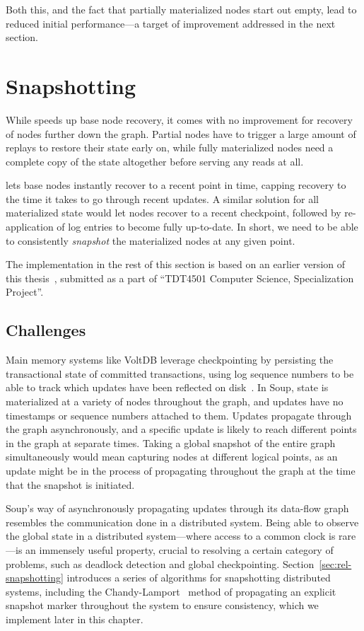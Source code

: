 Both this, and the fact that partially materialized nodes start out empty, lead
to reduced initial performance---a target of improvement addressed in the next
section.

\section{Snapshotting}\label{sec:snapshotting}

While  speeds up base node recovery, it comes with no
improvement for recovery of nodes further down the graph. Partial nodes have to
trigger a large amount of replays to restore their state early on, while fully
materialized nodes need a complete copy of the state altogether before serving
any reads at all.

 lets base nodes instantly recover to a recent point in
time, capping recovery to the time it takes to go through recent updates. A
similar solution for all materialized state would let nodes recover to a recent
checkpoint, followed by re-application of log entries to become fully
up-to-date. In short, we need to be able to consistently \textit{snapshot} the
materialized nodes at any given point.

The implementation in the rest of this section is based on an earlier version of
this thesis~\cite{project}, submitted as a part of ``TDT4501 Computer Science,
Specialization Project''.

\subsection{Challenges}

Main memory systems like VoltDB leverage checkpointing by persisting the
transactional state of committed transactions, using log sequence numbers to be
able to track which updates have been reflected on disk~\cite{voltdb-recovery}.
In Soup, state is materialized at a variety of nodes throughout the graph, and
updates have no timestamps or sequence numbers attached to them. Updates
propagate through the graph asynchronously, and a specific update is likely to
reach different points in the graph at separate times. Taking a global snapshot
of the entire graph simultaneously would mean capturing nodes at different
logical points, as an update might be in the process of propagating throughout
the graph at the time that the snapshot is initiated.

Soup's way of asynchronously propagating updates through its data-flow graph
resembles the communication done in a distributed system. Being able to observe
the global state in a distributed system---where access to a common clock is
rare---is an immensely useful property, crucial to resolving a certain category
of problems, such as deadlock detection and global checkpointing.
Section~\ref{sec:rel-snapshotting} introduces a series of algorithms for
snapshotting distributed systems, including the
Chandy-Lamport~\cite{chandy-lamport} method of propagating an explicit snapshot
marker throughout the system to ensure consistency, which we implement later in
this chapter.

